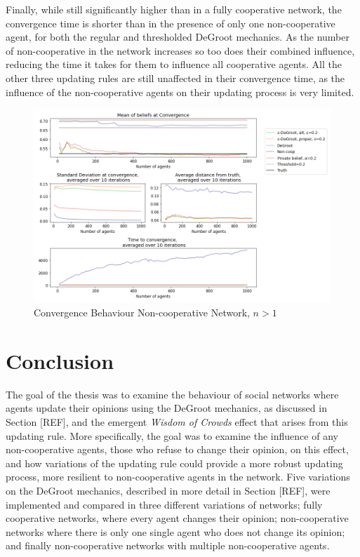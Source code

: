 \documentclass{article}
\begin{document}
\noindent Finally, while still significantly higher than in a fully cooperative network, the convergence time is shorter than in the presence of only one non-cooperative agent, for both the regular and thresholded DeGroot mechanics. As the number of non-cooperative in the network increases so too does their combined influence, reducing the time it takes for them to influence all cooperative agents. All the other three updating rules are still unaffected in their convergence time, as the influence of the non-cooperative agents on their updating process is very limited.

\begin{center}
    \begin{figure}[!htbp]
        \centering
        \includegraphics[width=1.2\textwidth]{ThesisKI/Images/WisdomCompare2.png}
        \caption{Convergence Behaviour Non-cooperative Network, $n>1$}
        \label{noncoop+:compare}
    \end{figure}
\end{center}

\newpage

\section{Conclusion}

The goal of the thesis was to examine the behaviour of social networks where agents update their opinions using the DeGroot mechanics, as discussed in Section [REF], and the emergent \emph{Wisdom of Crowds} effect that arises from this updating rule. More specifically, the goal was to examine the influence of any non-cooperative agents, those who refuse to change their opinion, on this effect, and how variations of the updating rule could provide a more robust updating process, more resilient to non-cooperative agents in the network. Five variations on the DeGroot mechanics, described in more detail in Section [REF], were implemented and compared in three different variations of networks; fully cooperative networks, where every agent changes their opinion; non-cooperative networks where there is only one single agent who does not change its opinion; and finally non-cooperative networks with multiple non-cooperative agents. 
\end{document}
